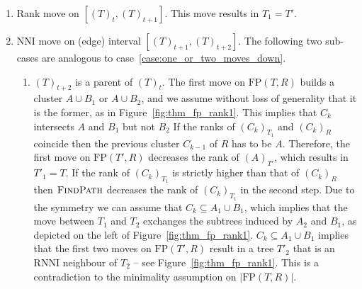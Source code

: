 \documentclass[11pt]{amsart}
\newcommand{\rnni}{\mathrm{RNNI}}
\newcommand{\findpath}{\textsc{FindPath}}
\newcommand{\nni}{\mathrm{NNI}}
\newcommand{\fp}{\mathrm{FP}}
\begin{document}
\begin{enumerate}[label = 2.\arabic*]
\item Rank move on $[(T)_t,(T)_{t+1}]$.
This move results in $T_1 = T'$.

\item $\nni$ move on (edge) interval $[(T)_{t+1},(T)_{t+2}]$.
The following two sub-cases are analogous to case~\ref{case:one_or_two_moves_down}.

\begin{enumerate}[label = \theenumi.\arabic*]
\item $(T)_{t+2}$ is a parent of $(T)_t$.
The first move on $\fp(T, R)$ builds a cluster $A \cup B_1$ or $A \cup B_2$, and we assume without loss of generality that it is the former, as in Figure~\ref{fig:thm_fp_rank1}.
This implies that $C_k$ intersects $A$ and $B_1$ but not $B_2$
If the ranks of $(C_k)_{T_1}$ and $(C_k)_R$ coincide then the previous cluster $C_{k-1}$ of $R$ has to be $A$.
Therefore, the first move on $\fp(T', R)$ decreases the rank of $(A)_{T'}$, which results in $T'_1 = T$.
If the rank of $(C_k)_{T_1}$ is strictly higher than that of $(C_k)_R$ then $\findpath$ decreases the rank of $(C_k)_{T_1}$ in the second step.
Due to the symmetry we can assume that $C_k \subseteq A_1 \cup B_1$, which implies that the move between $T_1$ and $T_2$ exchanges the subtrees induced by $A_2$ and $B_1$, as depicted on the left of Figure~\ref{fig:thm_fp_rank1}.
$C_k \subseteq A_1 \cup B_1$ implies that the first two moves on $\fp(T', R)$ result in a tree $T'_2$ that is an $\rnni$ neighbour of $T_2$ -- see Figure~\ref{fig:thm_fp_rank1}.
This is a contradiction to the minimality assumption on $|\fp(T,R)|$.


\end{enumerate}
\end{enumerate}
\end{document}
